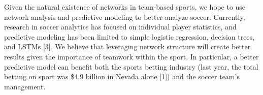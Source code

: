 Given the natural existence of networks in team-based sports, we hope to use network analysis and predictive modeling to better analyze soccer. Currently, research in soccer analytics has focused on individual player statistics, and predictive modeling has been limited to simple logistic regression, decision trees, and LSTMs [3]. We believe that leveraging network structure will create better results given the importance of teamwork within the sport. In particular, a better predictive model can benefit both the sports betting industry (last year, the total betting on sport was \$4.9 billion in Nevada alone [1]) and the soccer team's management.  


